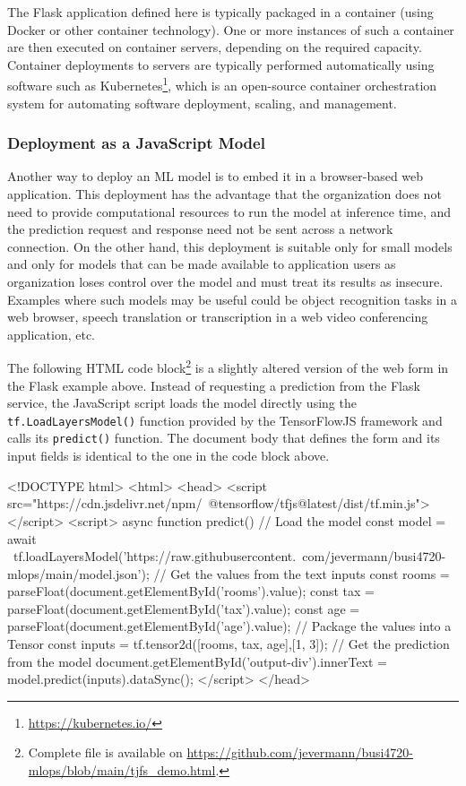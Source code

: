 The Flask application defined here is typically packaged in a container (using Docker or other container technology). One or more instances of such a container are then executed on container servers, depending on the required capacity. Container deployments to servers are typically performed automatically using software such as Kubernetes\footnote{\url{https://kubernetes.io/}}, which is an open-source container orchestration system for automating software deployment, scaling, and management. 

\subsubsection*{Deployment as a JavaScript Model}

Another way to deploy an ML model is to embed it in a browser-based web application. This deployment has the advantage that the organization does not need to provide computational resources to run the model at inference time, and the prediction request and response need not be sent across a network connection. On the other hand, this deployment is suitable only for small models and only for models that can be made available to application users as organization loses control over the model and must treat its results as insecure. Examples where such models may be useful could be object recognition tasks in a web browser, speech translation or transcription in a web video conferencing application, etc. 

The following HTML code block\footnote{Complete file is available on \url{https://github.com/jevermann/busi4720-mlops/blob/main/tjfs_demo.html}.} is a slightly altered version of the web form in the Flask example above. Instead of requesting a prediction from the Flask service, the JavaScript script loads the model directly using the \texttt{tf.LoadLayersModel()} function provided by the TensorFlowJS framework and calls its \texttt{predict()} function. The document body that defines the form and its input fields is identical to the one in the code block above. 

\begin{samepage}
\begin{htmlcode}
<!DOCTYPE html>
<html>
 <head>
  <script src="https://cdn.jsdelivr.net/npm/\
     @tensorflow/tfjs@latest/dist/tf.min.js"></script>
  <script>
   async function predict() {
    // Load the model
    const model = await \
     tf.loadLayersModel('https://raw.githubusercontent.\
      com/jevermann/busi4720-mlops/main/model.json');
    // Get the values from the text inputs
    const rooms = parseFloat(document.getElementById('rooms').value);
    const tax = parseFloat(document.getElementById('tax').value);
    const age = parseFloat(document.getElementById('age').value);
    // Package the values into a Tensor
    const inputs = tf.tensor2d([rooms, tax, age],[1, 3]);
    // Get the prediction from the model
    document.getElementById('output-div').innerText = 
     model.predict(inputs).dataSync();
   }
  </script>
 </head>
\end{htmlcode}
\end{samepage}

